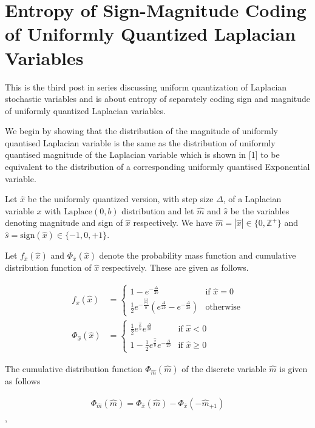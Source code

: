 \section{Entropy of Sign-Magnitude Coding of Uniformly Quantized Laplacian Variables}

This is the third post in series discussing uniform quantization of Laplacian stochastic variables and is about entropy of separately coding sign and magnitude of uniformly quantized Laplacian variables.

We begin by showing that the distribution of the magnitude of uniformly quantised Laplacian variable is the same as the distribution of uniformly quantised magnitude of the Laplacian variable which is shown in [1] to be equivalent to the distribution of a corresponding uniformly quantised Exponential variable.

Let $\hat{x}$ be the uniformly quantized version, with step size $\Delta$, of a Laplacian variable $x$ with $\text{Laplace}(0,b)$ distribution and let $\hat{m}$ and $\hat{s}$ be the variables denoting magnitude and sign of $\hat{x}$ respectively. We have $\hat{m} = |\hat{x}| \in \{0, \mathbb{Z}^+\}$ and $\hat{s} = \text{sign}(\hat{x}) \in \{-1, 0, +1\}$.

Let $f_{\hat{x}}(\hat{x})$ and $\Phi_{\hat{x}}(\hat{x})$ denote the probability mass function and cumulative distribution function of $\hat{x}$ respectively. These are given as follows.

\begin{align}f_{\hat{x}}(\hat{x}) &= \begin{cases}1-e^{-\frac{\Delta}{2b}} & \text{if $\hat{x} = 0$}\\ \frac{1}{2}e^{-\frac{|\hat{x}|}{b}}\left(e^{\frac{\Delta}{2b}} - e^{-\frac{\Delta}{2b}}\right) & \text{otherwise}\end{cases}\\\Phi_{\hat{x}}(\hat{x}) &= \begin{cases}\frac{1}{2}e^{\frac{\hat{x}}{b}}e^{\frac{\Delta}{2b}} & \text{if $\hat{x} < 0$}\\1-\frac{1}{2}e^{\frac{\hat{x}}{b}}e^{-\frac{\Delta}{2b}} & \text{if $\hat{x} \geq 0$}\end{cases}\end{align}

The cumulative distribution function $\Phi_{\hat{m}}(\hat{m})$ of the discrete variable $\hat{m}$ is given as follows

\begin{align}\Phi_{\hat{m}}(\hat{m}) = \Phi_{\hat{x}}(\hat{m}) - \Phi_{\hat{x}}(-\hat{m}_{+1})\end{align},

